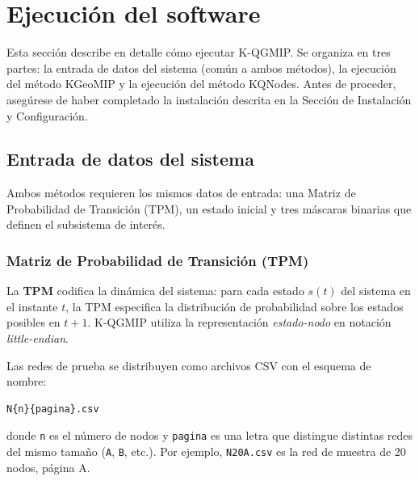 
\section{Ejecución del software}

Esta sección describe en detalle cómo ejecutar K-QGMIP. Se organiza en tres partes:
la entrada de datos del sistema (común a ambos métodos), la ejecución del método KGeoMIP
y la ejecución del método KQNodes. Antes de proceder, asegúrese de haber completado
la instalación descrita en la Sección de Instalación y Configuración.

\subsection{Entrada de datos del sistema}
\label{sec:entrada_datos}

Ambos métodos requieren los mismos datos de entrada: una Matriz de Probabilidad de
Transición (TPM), un estado inicial y tres máscaras binarias que definen el subsistema
de interés.

\subsubsection{Matriz de Probabilidad de Transición (TPM)}

La \textbf{TPM} codifica la dinámica del sistema: para cada estado $s(t)$ del sistema en
el instante $t$, la TPM especifica la distribución de probabilidad sobre los estados
posibles en $t+1$. K-QGMIP utiliza la representación \textit{estado-nodo} en notación
\textit{little-endian}.

Las redes de prueba se distribuyen como archivos CSV con el esquema de nombre:

\begin{lstlisting}
N{n}{pagina}.csv
\end{lstlisting}

donde \texttt{n} es el número de nodos y \texttt{pagina} es una letra que distingue
distintas redes del mismo tamaño (\texttt{A}, \texttt{B}, etc.).
Por ejemplo, \texttt{N20A.csv} es la red de muestra de 20 nodos, página A.

